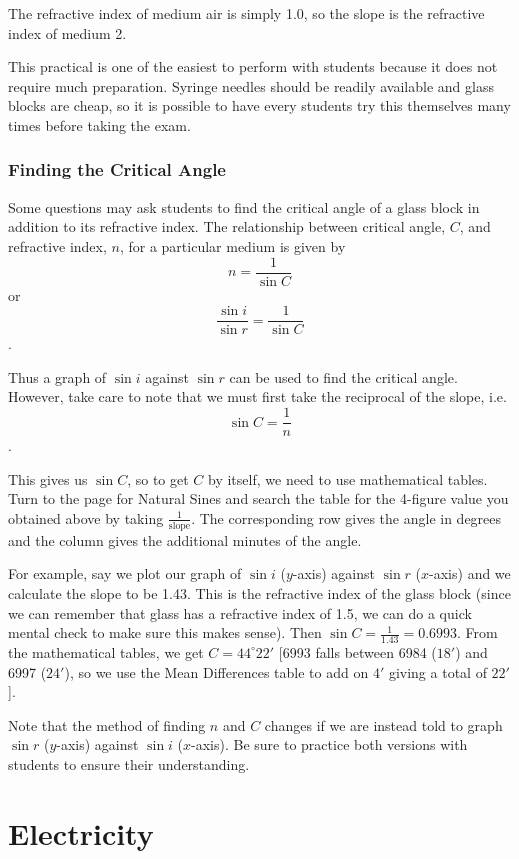 The refractive index of medium air is simply 1.0, so the slope is the refractive index of
medium 2.

This practical is one of the easiest to perform with students because it does not
require much preparation. Syringe needles should be readily available and glass blocks are
cheap, so it is possible to have every students try this themselves many times before
taking the exam.

\subsubsection{Finding the Critical Angle}
Some questions may ask students to find the critical angle of a glass block in addition to its refractive index. The relationship between critical angle, $C$, and refractive index, $n$, for a particular medium is given by 
$$n = \frac{1}{\sin{C}}$$ or $$\frac{\sin{i}}{\sin{r}} = \frac{1}{\sin{C}}$$.

Thus a graph of $\sin{i}$ against $\sin{r}$ can be used to find the critical angle. However, take care to note that we must first take the reciprocal of the slope, i.e.
$$\sin{C} = \frac{1}{n}$$.

This gives us $\sin{C}$, so to get $C$ by itself, we need to use mathematical tables. Turn to the page for Natural Sines and search the table for the 4-figure value you obtained above by taking $\frac{1}{\text{slope}}$. The corresponding row gives the angle in degrees and the column gives the additional minutes of the angle.

For example, say we plot our graph of $\sin{i}$ ($y$-axis) against $\sin{r}$ ($x$-axis) and we calculate the slope to be 1.43. This is the refractive index of the glass block (since we can remember that glass has a refractive index of 1.5, we can do a quick mental check to make sure this makes sense). Then $\sin{C} = \frac{1}{1.43} = 0.6993$. From the mathematical tables, we get $C = 44^\circ 22'$ [6993 falls between 6984 ($18'$) and 6997 ($24'$), so we use the Mean Differences table to add on $4'$ giving a total of $22'$].

Note that the method of finding $n$ and $C$ changes if we are instead told to graph $\sin{r}$ ($y$-axis) against $\sin{i}$ ($x$-axis). Be sure to practice both versions with students to ensure their understanding.

\section{Electricity}

